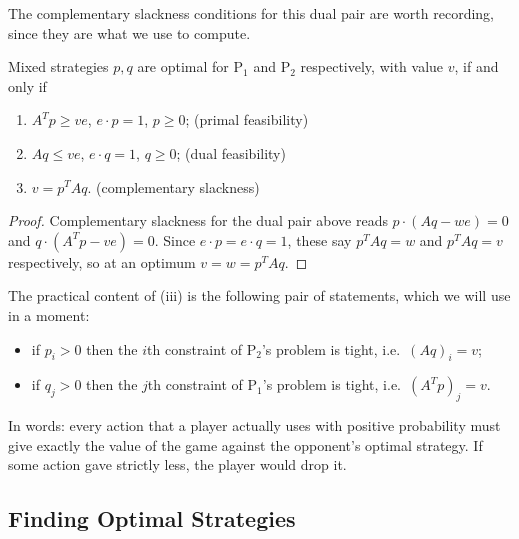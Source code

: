 The complementary slackness conditions for this dual pair are worth recording, since they are what we use to compute.

\begin{theorem}
    Mixed strategies $p, q$ are optimal for $\mathrm{P}_1$ and $\mathrm{P}_2$ respectively, with value $v$, if and only if
    \begin{enumerate}[label=(\roman*)]
        \item $A^Tp \geq ve$, $e\cdot p = 1$, $p \geq 0$; \hfill (primal feasibility)
        \item $Aq \leq ve$, $e\cdot q = 1$, $q \geq 0$; \hfill (dual feasibility)
        \item $v = p^TAq$. \hfill (complementary slackness)
    \end{enumerate}
\end{theorem}
\begin{proof}
    Complementary slackness for the dual pair above reads $p\cdot(Aq - we) = 0$ and $q\cdot(A^Tp - ve) = 0$. Since $e\cdot p = e\cdot q = 1$, these say $p^TAq = w$ and $p^TAq = v$ respectively, so at an optimum $v = w = p^TAq$.
\end{proof}

The practical content of (iii) is the following pair of statements, which we will use in a moment:
\begin{itemize}
    \item if $p_i > 0$ then the $i$th constraint of $\mathrm{P}_2$'s problem is tight, i.e.\ $(Aq)_i = v$;
    \item if $q_j > 0$ then the $j$th constraint of $\mathrm{P}_1$'s problem is tight, i.e.\ $(A^Tp)_j = v$.
\end{itemize}
In words: every action that a player actually uses with positive probability must give exactly the value of the game against the opponent's optimal strategy. If some action gave strictly less, the player would drop it.

\subsection{Finding Optimal Strategies}

